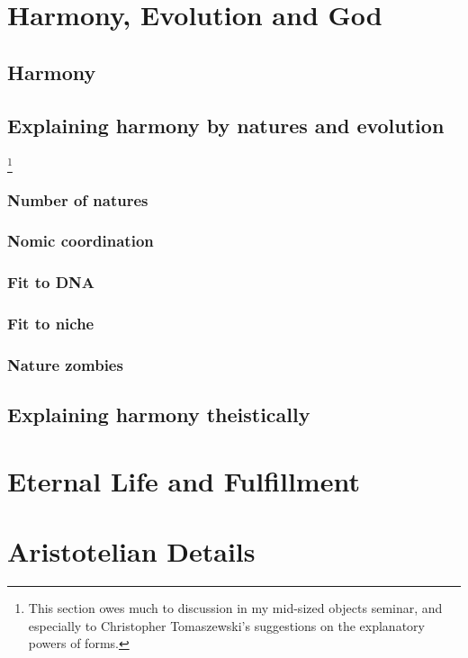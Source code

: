 \def\mychapter{VIII}

\chapter{Harmony, Evolution and God}\label{ch:God}
\section{Harmony}
\section{Explaining harmony by natures and evolution}
\footnote{This section owes much to discussion in my mid-sized objects seminar, and especially to Christopher Tomaszewski's suggestions on the explanatory powers of forms.}
\subsection{Number of natures}
\subsection{Nomic coordination}
\subsection{Fit to DNA}
\subsection{Fit to niche}
\subsection{Nature zombies}
\section{Explaining harmony theistically}
\chaptertail

\def\mychapter{IX}

\chapter{Eternal Life and Fulfillment}\label{ch:eternal-life}
\chaptertail

\def\mychapter{X}

\chapter{Aristotelian Details}\label{ch:details}
\chaptertail
